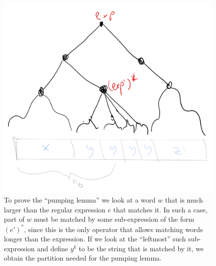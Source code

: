 \hypertarget{pumping}{}


\begin{figure}
\centering
\includegraphics[width=\textwidth, height=0.25\paperheight, keepaspectratio]{../figure/pumpinglemma.png}
\caption{To prove the ``pumping lemma'' we look at a word \(w\) that is
much larger than the regular expression \(e\) that matches it. In such a
case, part of \(w\) must be matched by some sub-expression of the form
\((e')^*\), since this is the only operator that allows matching words
longer than the expression. If we look at the ``leftmost'' such
sub-expression and define \(y^k\) to be the string that is matched by
it, we obtain the partition needed for the pumping lemma.}
\label{pumpinglemmafig}
\end{figure}

